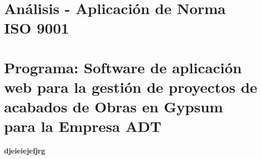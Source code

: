 \documentclass[11pt,a4paper]{article}
\begin{document}
\section{Análisis - Aplicación de Norma ISO 9001}
\section{Programa: Software de aplicación web para la gestión de proyectos de acabados de Obras 
en Gypsum para la Empresa ADT} 
\paragraph*{djeieiejefjrg}
\end{document}
